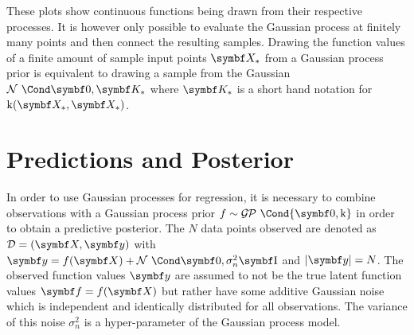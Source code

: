 These plots show continuous functions being drawn from their respective processes.
It is however only possible to evaluate the Gaussian process at finitely many points and then connect the resulting samples.
Drawing the function values of a finite amount of sample input points $\mat{X_\ast}$ from a Gaussian process prior is equivalent to drawing a sample from the Gaussian $\Gaussian{\mat{0}, \mat{K_\ast}}$ where $\mat{K_\ast}$ is a short hand notation for $\K(\mat{X_\ast}, \mat{X_\ast})$.

\section{Predictions and Posterior}
In order to use Gaussian processes for regression, it is necessary to combine observations with a Gaussian process prior $f \sim \GP\Cond{\mat{0}, \K}$ in order to obtain a predictive posterior.
The $N$ data points observed are denoted as $\Dc = \left( \mat{X}, \mat{y} \right)$ with $\mat{y} = f(\mat{X}) + \Gaussian{\mat{0}, \sigma_n^2 \Eye}$ and $\abs{\mat{y}} = N$.
The observed function values $\mat{y}$ are assumed to not be the true latent function values $\mat{f} = f(\mat{X})$ but rather have some additive Gaussian noise which is independent and identically distributed for all observations.
The variance of this noise $\sigma_n^2$ is a hyper-parameter of the Gaussian process model.

